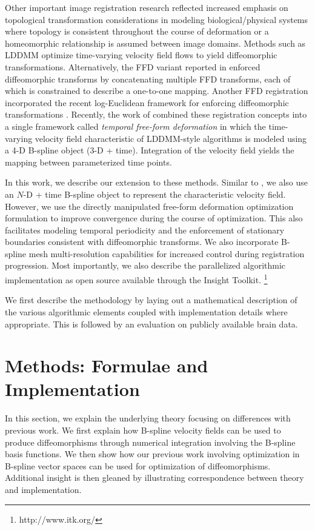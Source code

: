 \documentclass{llncs}
\begin{document}
Other important image registration research
reflected increased emphasis on topological transformation considerations
in modeling biological/physical systems where topology is 
consistent throughout the course of deformation or a 
homeomorphic relationship is assumed between image domains.
Methods such as LDDMM \cite{beg2005} optimize time-varying velocity field 
flows to yield diffeomorphic transformations.  Alternatively, the FFD 
variant reported in \cite{rueckert2006} enforced diffeomorphic transforms
by concatenating multiple FFD transforms, each of which is constrained
to describe a one-to-one mapping.  Another FFD registration
incorporated the recent log-Euclidean framework for enforcing diffeomorphic
transformations \cite{Modat2011}.
Recently, the work of 
\cite{de-craene2011} combined these registration concepts into a single
framework called {\em temporal free-form deformation} in which the 
time-varying velocity field characteristic of LDDMM-style algorithms
is modeled using a 4-D B-spline object (3-D + time).  Integration of 
the velocity field yields the mapping between parameterized time points.

In this work, we describe our extension to these methods.  Similar to 
\cite{de-craene2011}, we also use an $N$-D + time B-spline object to 
represent the characteristic velocity field.  However, we use the 
directly manipulated free-form deformation optimization formulation to improve 
convergence during the course of optimization.  This also facilitates
modeling temporal periodicity and
the enforcement of stationary boundaries consistent with diffeomorphic
transforms.
We also incorporate B-spline mesh multi-resolution capabilities
for increased control during registration progression.  
Most importantly, we also describe
the parallelized algorithmic implementation as open source available through the Insight Toolkit.%
\footnote{
http://www.itk.org/
}

We first describe the methodology by laying out a mathematical description 
of the various algorithmic elements coupled with implementation details
where appropriate.  This is followed by an evaluation on publicly available
brain data. 

\section{Methods: Formulae  and Implementation}

In this section, we explain the underlying theory focusing on
differences with previous work.  We first explain how B-spline
velocity fields can be used to produce diffeomorphisms through
numerical integration involving the B-spline basis functions. 
We then show how our previous work involving optimization in 
B-spline vector spaces \cite{tustison2009} can be used for
optimization of diffeomorphisms.  Additional insight is then
gleaned by illustrating correspondence between theory and 
implementation.
\end{document}
